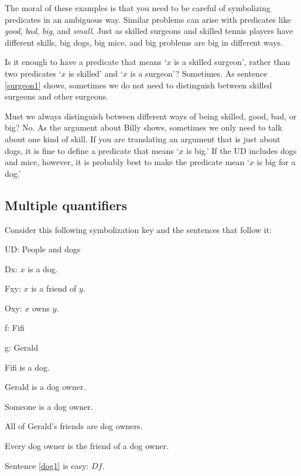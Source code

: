 The moral of these examples is that you need to be careful of symbolizing predicates in an ambiguous way. Similar problems can arise with predicates like \emph{good}, \emph{bad}, \emph{big}, and \emph{small}. Just as skilled surgeons and skilled tennis players have different skills, big dogs, big mice, and big problems are big in different ways.

Is it enough to have a predicate that means `$x$ is a skilled surgeon', rather than two predicates `$x$ is skilled' and `$x$ is a surgeon'? Sometimes. As sentence \ref{surgeon1} shows, sometimes we do not need to distinguish between skilled surgeons and other surgeons.

Must we always distinguish between different ways of being skilled, good, bad, or big? No. As the argument about Billy shows, sometimes we only need to talk about one kind of skill. If you are translating an argument that is just about dogs, it is fine to define a predicate that means `$x$ is big.' If the UD includes dogs and mice, however, it is probably best to make the predicate mean `$x$ is big for a dog.'


\subsection{Multiple quantifiers}
Consider this following symbolization key and the sentences that follow it:
\begin{ekey}
\item{UD:} People and dogs
\item{Dx:} $x$ is a dog.
\item{Fxy:} $x$ is a friend of $y$.
\item{Oxy:} $x$ owns $y$.
\item{f:} Fifi
\item{g:} Gerald
\end{ekey}

\begin{earg}
\item[\ex{dog1}] Fifi is a dog.
\item[\ex{dog2}] Gerald is a dog owner.
\item[\ex{dog3}] Someone is a dog owner.
\item[\ex{dog4}] All of Gerald's friends are dog owners.
\item[\ex{dog5}] Every dog owner is the friend of a dog owner.
\end{earg}

Sentence \ref{dog1} is easy: $Df$.

